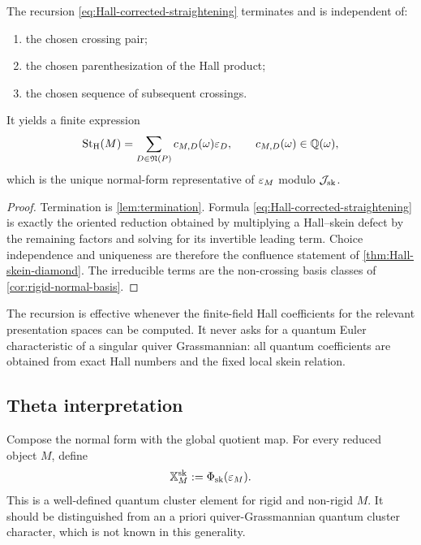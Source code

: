 \begin{theorem}
\label{thm:canonical-Hall-straightening}
The recursion \eqref{eq:Hall-corrected-straightening} terminates and is
independent of:
\begin{enumerate}[label=(\roman*),leftmargin=2.3em]
\item the chosen crossing pair;
\item the chosen parenthesization of the Hall product;
\item the chosen sequence of subsequent crossings.
\end{enumerate}
It yields a finite expression
\begin{equation}
 \operatorname{St}_{\mathrm H}(M)
 =\sum_{D\in\mathfrak N(P)}c_{M,D}(\omega)\varepsilon_D,
 \qquad c_{M,D}(\omega)\in\mathbb Q(\omega),
 \label{eq:Hall-rigid-expansion}
\end{equation}
which is the unique normal-form representative of $\varepsilon_M$ modulo $\mathcal J_{\mathrm{sk}}$.
\end{theorem}

\begin{proof}
Termination is \cref{lem:termination}.  Formula
\eqref{eq:Hall-corrected-straightening} is exactly the oriented reduction
obtained by multiplying a Hall--skein defect by the remaining factors and
solving for its invertible leading term.  Choice independence and uniqueness
are therefore the confluence statement of
\cref{thm:Hall-skein-diamond}.  The irreducible terms are the non-crossing
basis classes of \cref{cor:rigid-normal-basis}.
\end{proof}

The recursion is effective whenever the finite-field Hall coefficients for
the relevant presentation spaces can be computed.  It never asks for a
quantum Euler characteristic of a singular quiver Grassmannian: all quantum
coefficients are obtained from exact Hall numbers and the fixed local skein
relation.

\subsection{Theta interpretation}

Compose the normal form with the global quotient map.  For every reduced
object $M$, define
\begin{equation}
 \mathbb X_M^{\rm sk}
 :=\Phi_{\rm sk}(\varepsilon_M).
 \label{eq:skein-quantum-character}
\end{equation}
This is a well-defined quantum cluster element for rigid and non-rigid $M$.
It should be distinguished from an a priori quiver-Grassmannian quantum
cluster character, which is not known in this generality.

